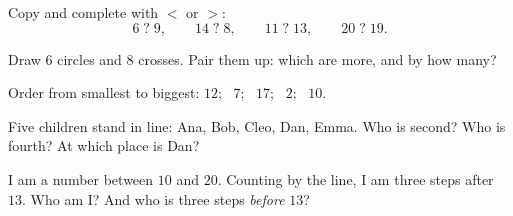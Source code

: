 \begin{exercise}[$\star$]\label{exo:g1:counting:5}
Copy and complete with $<$ or $>$:
\[
6 \;?\; 9, \qquad
14 \;?\; 8, \qquad
11 \;?\; 13, \qquad
20 \;?\; 19 .
\]
\end{exercise}

\begin{exercise}[$\star$]\label{exo:g1:counting:6}
Draw $6$ circles and $8$ crosses. Pair them up: which are more, and
by how many?
\end{exercise}

\begin{exercise}[$\star$]\label{exo:g1:counting:7}
Order from smallest to biggest: $12$; \ $7$; \ $17$; \ $2$; \ $10$.
\end{exercise}

\begin{exercise}[$\star$]\label{exo:g1:counting:8}
Five children stand in line: Ana, Bob, Cleo, Dan, Emma. Who is
second? Who is fourth? At which place is Dan?
\end{exercise}

\begin{exercise}[$\star\star$]\label{exo:g1:counting:9}
I am a number between $10$ and $20$. Counting by the line, I am
three steps after $13$. Who am I? And who is three steps
\emph{before} $13$?
\end{exercise}
